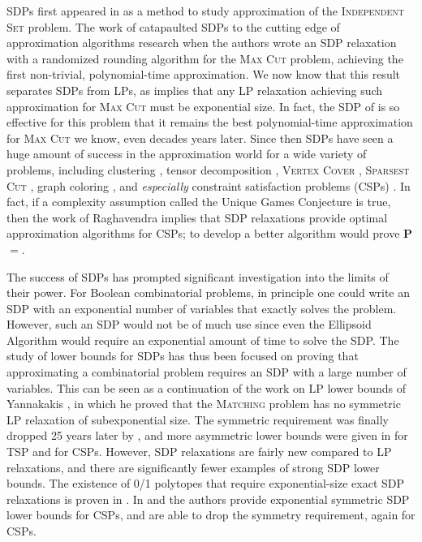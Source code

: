 SDPs first appeared in \cite{Lovasz79} as a method to study approximation of the \textsc{Independent Set} problem. The work of \cite{GW95} catapaulted SDPs to the cutting edge of approximation algorithms research when the authors wrote an SDP relaxation with a randomized rounding algorithm for the \textsc{Max Cut} problem, achieving the first non-trivial, polynomial-time approximation. We now know that this result separates SDPs from LPs, as \cite{CLRS16} implies that any LP relaxation achieving such approximation for \textsc{Max Cut} must be exponential size. In fact, the SDP of \cite{GW95} is so effective for this problem that it remains the best polynomial-time approximation for \textsc{Max Cut} we know, even decades years later. Since then SDPs have seen a huge amount of success in the approximation world for a wide variety of problems, including clustering \cite{PW07}, tensor decomposition \cite{TS15}, \textsc{Vertex Cover} \cite{Kar09}, \textsc{Sparsest Cut} \cite{ARV09}, graph coloring \cite{Chlam07}, and \emph{especially} constraint satisfaction problems (CSPs) \cite{FJ97,HZ99,CMM09}. In fact, if a complexity assumption called the Unique Games Conjecture \cite{Khot02} is true, then the work of Raghavendra \cite{Ragh08} implies that SDP relaxations provide optimal approximation algorithms for CSPs; to develop a better algorithm would prove \textbf{P}$ = $\np. 

The success of SDPs has prompted significant investigation into the limits of their power. For Boolean combinatorial problems, in principle one could write an SDP with an exponential number of variables that exactly solves the problem. However, such an SDP would not be of much use since even the Ellipsoid Algorithm would require an exponential amount of time to solve the SDP. The study of lower bounds for SDPs has thus been focused on proving that approximating a combinatorial problem requires an SDP with a large number of variables. This can be seen as a continuation of the work on LP lower bounds of Yannakakis \cite{Yann88}, in which he proved that the \textsc{Matching} problem has no symmetric LP relaxation of subexponential size. The symmetric requirement was finally dropped 25 years later by \cite{Roth14}, and more asymmetric lower bounds were given in \cite{FMPTHW15} for \textsc{TSP} and \cite{CLRS16} for CSPs. 
However, SDP relaxations are fairly new compared to LP relaxations, and there are significantly fewer examples of strong SDP lower bounds. The existence of 0/1 polytopes that require exponential-size exact SDP relaxations is proven in \cite{BDP15}. In \cite{FSP13} and \cite{LRST14} the authors provide exponential symmetric SDP lower bounds for CSPs, and \cite{LRS15} are able to drop the symmetry requirement, again for CSPs. 


